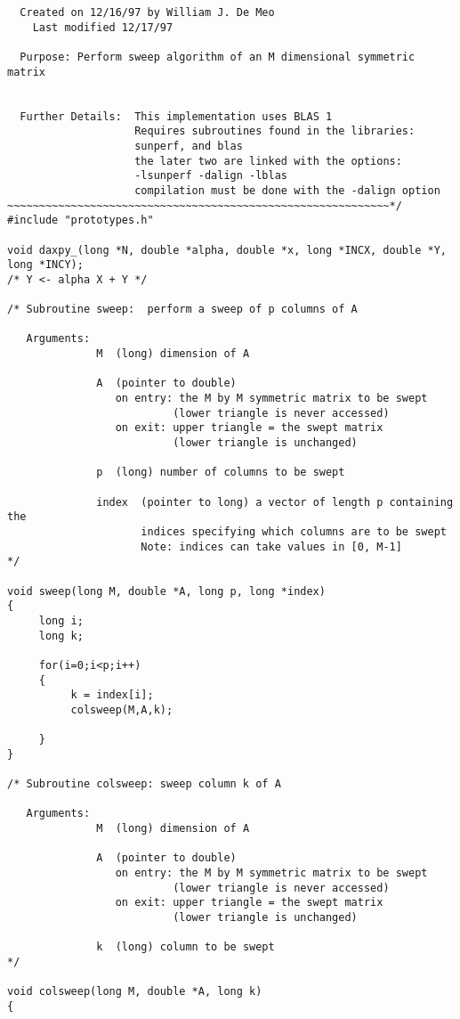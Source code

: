 \documentclass{article}
\begin{document}
{\begin{verbatim}
  Created on 12/16/97 by William J. De Meo
    Last modified 12/17/97

  Purpose: Perform sweep algorithm of an M dimensional symmetric matrix

           
  Further Details:  This implementation uses BLAS 1
                    Requires subroutines found in the libraries:
                    sunperf, and blas
                    the later two are linked with the options:
                    -lsunperf -dalign -lblas
                    compilation must be done with the -dalign option
~~~~~~~~~~~~~~~~~~~~~~~~~~~~~~~~~~~~~~~~~~~~~~~~~~~~~~~~~~~~*/
#include "prototypes.h"

void daxpy_(long *N, double *alpha, double *x, long *INCX, double *Y, long *INCY);
/* Y <- alpha X + Y */

/* Subroutine sweep:  perform a sweep of p columns of A

   Arguments: 
              M  (long) dimension of A

              A  (pointer to double) 
                 on entry: the M by M symmetric matrix to be swept 
                          (lower triangle is never accessed)
                 on exit: upper triangle = the swept matrix
                          (lower triangle is unchanged)

              p  (long) number of columns to be swept

              index  (pointer to long) a vector of length p containing the 
                     indices specifying which columns are to be swept
                     Note: indices can take values in [0, M-1]
*/

void sweep(long M, double *A, long p, long *index)
{
     long i;
     long k;
  
     for(i=0;i<p;i++)
     {
          k = index[i];
          colsweep(M,A,k);
      
     }
}

/* Subroutine colsweep: sweep column k of A

   Arguments: 
              M  (long) dimension of A

              A  (pointer to double) 
                 on entry: the M by M symmetric matrix to be swept 
                          (lower triangle is never accessed)
                 on exit: upper triangle = the swept matrix
                          (lower triangle is unchanged)

              k  (long) column to be swept
*/

void colsweep(long M, double *A, long k)
{


\end{verbatim}}
\end{document}
